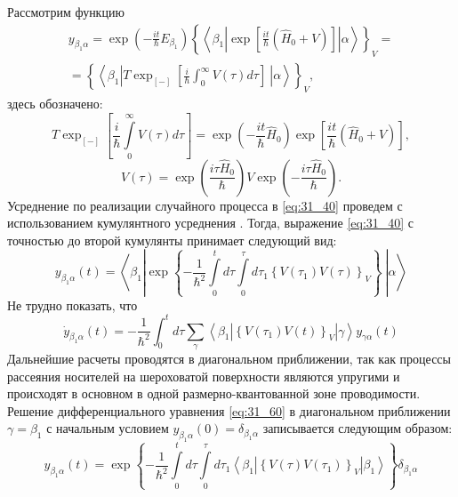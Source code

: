 Рассмотрим функцию
\begin{multline} \label{eq:31_40}
y_{{\beta }_1\alpha }=\exp\left(-\frac{it}{\hbar }E_{\beta_1}\right){\left\{\left\langle {\beta }_1\left|\exp\left[ {\frac{it}{\hbar }\left( {\hat {H}_0 + V} \right)} \right]\right|\alpha \right\rangle \right\}}_V=\\
={\left\{\left\langle {\beta }_1\left|T{\exp_{[-]} \left[\frac{i}{\hbar }\int^{\infty }_0{V\left(\tau \right)d \tau }\right]\ }\right|\alpha \right\rangle \right\}}_V,
\end{multline}
здесь обозначено:
\[
T{\exp_{\left[-\right]} \left[\frac{i}{\hbar }\int\limits^{\infty }_0 {V\left(\tau \right)d \tau } \right]}
	=\exp\left( {-\frac{it}{\hbar }\hat {H}_0 }\right)\exp\left[ {\frac{it}{\hbar }\left( {\hat {H}_0 + V} \right)} \right],
\] 
\[
V(\tau ) = \exp\left( {\frac{i\tau \hat {H}_0 }{\hbar }}\right)
V\exp\left( { - \frac{i\tau \hat {H}_0 }{\hbar }} \right).
\]
Усреднение по реализации случайного процесса в \eqref{eq:31_40} проведем с использованием кумулянтного усреднения \cite{Kubo1957a}. Тогда, выражение \eqref{eq:31_40} с точностью до второй кумулянты принимает следующий вид:
\[
y_{{\beta }_1\alpha }\left(t\right)=\left\langle {\beta }_1\left|{\exp \left\{-\frac{1}{{\hbar }^2}\int\limits^t_0{d \tau \int\limits^{\tau }_0{d {\tau }_1{\left\{V\left({\tau }_1\right)V\left(\tau \right)\right\}}_V}}\right\}\ }\right|\alpha \right\rangle
\]
Не трудно показать, что
\begin{equation} \label{eq:31_60}
{\dot{y}}_{{\beta }_1\alpha }\left(t\right)=-\frac{1}{{\hbar }^2}\int^t_0{d \tau \sum_{\gamma }{\left\langle {\beta }_1\left|{\left\{V\left({\tau }_1\right)V\left(t\right)\right\}}_V\right|\gamma \right\rangle y_{\gamma \alpha }\left(t\right)}}
\end{equation} 
Дальнейшие расчеты проводятся в диагональном приближении, так как процессы рассеяния носителей на шероховатой поверхности являются упругими и происходят в основном в одной размерно-квантованной зоне проводимости. Решение дифференциального уравнения \eqref{eq:31_60} в диагональном приближении $\gamma ={\beta }_1$ с начальным условием $y_{{\beta }_1\alpha }\left(0\right)={\delta }_{{\beta }_1\alpha }$ записывается следующим образом:
\begin{equation} \label{eq:31_70}
y_{\beta_1\alpha }(t)=\exp \left\{-\frac{1}{{\hbar }^2}\int\limits_0^t{d \tau \int\limits_0^{\tau} {d \tau_1 \left\langle \beta_1 \left| {\left\{V\left(\tau \right)V\left({\tau }_1\right)\right\}}_V\right| \beta_1 \right\rangle}} \right\} \delta_{\beta_1\alpha}
\end{equation} 
